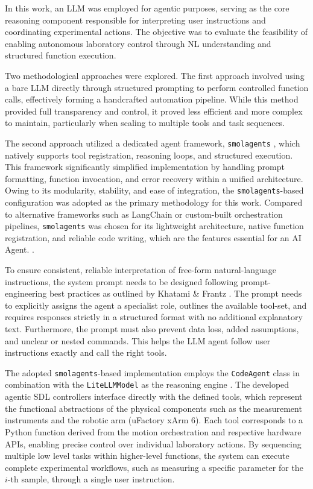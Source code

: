 

In this work, an LLM was employed for agentic purposes, serving as the core reasoning component responsible for interpreting user instructions and coordinating experimental actions. The objective was to evaluate the feasibility of enabling autonomous laboratory control through NL understanding and structured function execution.

Two methodological approaches were explored. The first approach involved using a bare LLM directly through structured prompting to perform controlled function calls, effectively forming a handcrafted automation pipeline. While this method provided full transparency and control, it proved less efficient and more complex to maintain, particularly when scaling to multiple tools and task sequences. 

The second approach utilized a dedicated agent framework, \texttt{smolagents} \cite{huggingface_smolagents_good_agents, datacamp_smolagents_guide, towardsai2024comparison}, which natively supports tool registration, reasoning loops, and structured execution. This framework significantly simplified implementation by handling prompt formatting, function invocation, and error recovery within a unified architecture. Owing to its modularity, stability, and ease of integration, the \texttt{smolagents}-based configuration was adopted as the primary methodology for this work. Compared to alternative frameworks such as LangChain or custom-built orchestration pipelines, \texttt{smolagents} was chosen for its lightweight architecture, native function registration, and reliable code writing, which are the features essential for an AI Agent. \cite{openai2023practicalagents, towardsai2024comparison}.

To ensure consistent, reliable interpretation of free-form natural-language instructions, the system prompt needs to be designed following prompt-engineering best practices as outlined by Khatami \& Frantz \cite{khatami2024prompt}. The prompt needs to explicitly assigns the agent a specialist role, outlines the available tool-set, and requires responses strictly in a structured format with no additional explanatory text. Furthermore, the prompt must also prevent data loss, added assumptions, and unclear or nested commands. This helps the LLM agent follow user instructions exactly and call the right tools.

The adopted \texttt{smolagents}-based implementation employs the \texttt{CodeAgent} class in combination with the \texttt{LiteLLMModel} as the reasoning engine \cite{openai_litellm_agents_sdk}. The developed agentic SDL controllers interface directly with the defined tools, which represent the functional abstractions of the physical components such as the measurement instruments and the robotic arm (uFactory xArm 6). Each tool corresponds to a Python function derived from the motion orchestration and respective hardware APIs, enabling precise control over individual laboratory actions. By sequencing multiple low level tasks within higher-level functions, the system can execute complete experimental workflows, such as measuring a specific parameter for the $i$-th sample, through a single user instruction.

